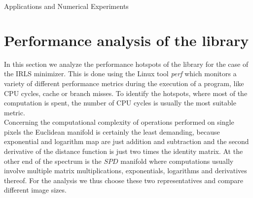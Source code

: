 \begin{chapter}{Applications and Numerical Experiments}
\FloatBarrier
\section{Performance analysis of the library} %
\label{sec:Performance analysis of the library}
In this section we analyze the performance hotspots of the library for the case of the IRLS minimizer. This is done using the Linux tool \emph{perf} which monitors a variety of different
performance metrics during the execution of a program, like CPU cycles, cache or branch misses. To identify the hotspots, where most of the computation is spent, the number of CPU cycles is
usually the most suitable metric.\\

Concerning the computational complexity of operations performed on single pixels the Euclidean manifold is certainly the least demanding, because exponential and logarithm map are just 
addition and subtraction and the second derivative of the distance function is just two times the identity matrix. At the other end of the spectrum is the $SPD$ manifold where
computations usually involve multiple matrix multiplications, exponentials, logarithms and derivatives thereof. For the analysis we thus choose these two representatives and compare
different image sizes.\\


\end{chapter}
